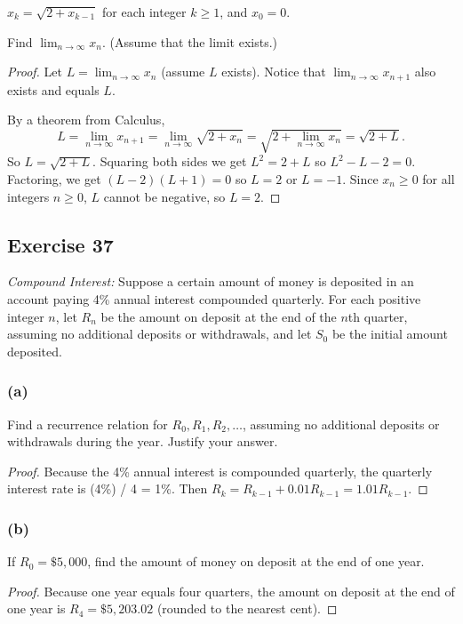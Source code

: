 \documentclass[14pt]{extarticle}
\newcommand{\dps}{\displaystyle}
\begin{document}
\(\dps x_k = \sqrt{2 + x_{k-1}}\) for each integer \(k \geq 1\), and \(x_0 = 0\).

Find \(\dps \lim_{n\to\infty} x_n\). (Assume that the limit exists.)

\begin{proof}
Let \(\dps L = \lim_{n\to\infty} x_n\) (assume $L$ exists). Notice that \(\dps \lim_{n\to\infty} x_{n+1}\) also exists 
and equals $L$.

By a theorem from Calculus, 
\[
L = \lim_{n\to\infty} x_{n+1} = \lim_{n\to\infty} \sqrt{2 + x_n} = \sqrt{2 + \lim_{n\to\infty} x_n} = \sqrt{2+L}.
\]
So \(L = \sqrt{2 + L}\). Squaring both sides we get \(L^2 = 2 + L\) so \(L^2 - L - 2 = 0\). Factoring, we get
\((L-2)(L+1) = 0\) so $L = 2$ or $L = -1$. Since $x_n \geq 0$ for all integers $n \geq 0$, $L$ cannot be negative, so
$L = 2$.
\end{proof}

\subsection{Exercise 37}
{\it Compound Interest:} Suppose a certain amount of money is deposited in an account paying 4\% annual interest compounded quarterly. For each positive integer $n$, let $R_n$ be the amount on deposit at the end of the $n$th quarter, assuming no additional deposits or withdrawals, and let $S_0$ be the initial amount deposited.

\subsubsection{(a)}
Find a recurrence relation for $R_0, R_1, R_2, \ldots$, assuming no additional deposits or withdrawals during the 
year. Justify your answer.

\begin{proof}
Because the 4\% annual interest is compounded quarterly, the quarterly interest rate is (4\%) / 4 = 1\%. Then 
\(R_k = R_{k-1} + 0.01R_{k - 1} = 1.01R_{k-1}.\)
\end{proof}

\subsubsection{(b)}
If $R_0 = \$5,000$, find the amount of money on deposit at the end of one year.

\begin{proof}
Because one year equals four quarters, the amount on deposit at the end of one year is \(R_4 = \$5,203.02\)
(rounded to the nearest cent).
\end{proof}
\end{document}
